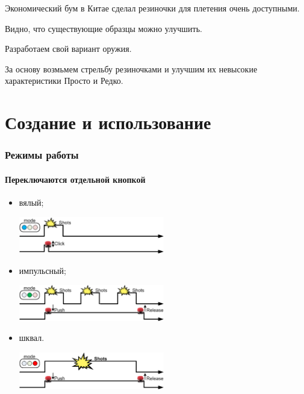 Экономический бум в Китае сделал резиночки для плетения очень доступными.

\begin{frame}
    \begin{center}
        Видно, что существующие образцы можно улучшить. 
        
        \par\bigskip
        
        Разработаем свой вариант оружия.
        
        \par\bigskip

        За основу возмьмем стрельбу резиночками и улучшим их невысокие характеристики \alert{Просто} и \alert{Редко}.
    \end{center}
\end{frame}


\section{Создание и использование}

\begin{frame}
    \frametitle{\myDevice}
\end{frame}

\begin{frame}
    \frametitle{Режимы работы \myDevice}
    \framesubtitle{Переключаются отдельной кнопкой}
    
    \begin{itemize}
        \item вялый;
            \begin{center}
                \includegraphics[width=0.5\textwidth]{fig/modeSlow}
            \end{center}
        \item импульсный;
            \begin{center}
                \includegraphics[width=0.5\textwidth]{fig/modePulse}
            \end{center}
        \item шквал.
            \begin{center}
                \includegraphics[width=0.5\textwidth]{fig/modeStorm}
            \end{center}
    \end{itemize}    
\end{frame}


